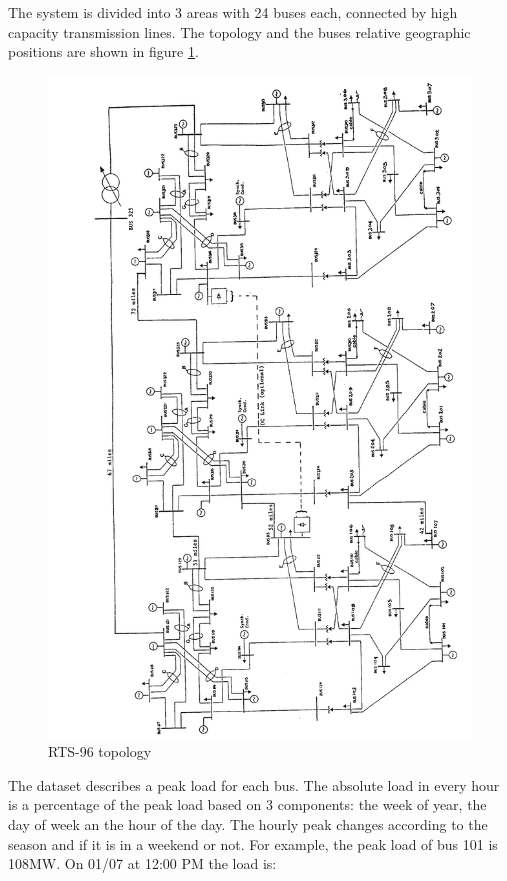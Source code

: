 \documentclass[12pt,LUDisStyle,twosided]{book}
\begin{document}
The system is divided into 3 areas with 24 buses each, connected by high capacity transmission lines. The topology and the buses relative geographic positions are shown in figure \ref{fig:ieeetopology}.

\begin{figure}[H]
  \includegraphics[width=\textwidth,height=\textheight,keepaspectratio]{ieeetopology.png}
  \caption{RTS-96 topology \cite{wongieee}}
  \label{fig:ieeetopology}
\end{figure}

The dataset describes a peak load for each bus. The absolute load in every hour is a percentage of the peak load based on 3 components: the week of year, the day of week an the hour of the day. The hourly peak changes according to the season and if it is in a weekend or not. For example, the peak load of bus 101 is 108MW. On 01/07 at 12:00 PM the load is:
\end{document}

